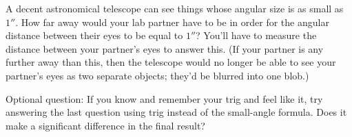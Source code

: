 \answerspace{1in}

A decent astronomical telescope can see things whose angular size is
as small as $1''$.  How far away would your lab partner have to be in
order for the angular distance between their eyes to be equal to
$1''$?  You'll have to measure the distance between your partner's
eyes to answer this.  (If your partner is any further away than this,
then the telescope would no longer be able to see your partner's eyes
as two separate objects; they'd be blurred into one blob.)


\answerspace{1in}

Optional question:
If you know and remember your trig and feel like it, try answering
the last question using trig instead of the small-angle formula.  Does
it make a significant difference in the final result?

